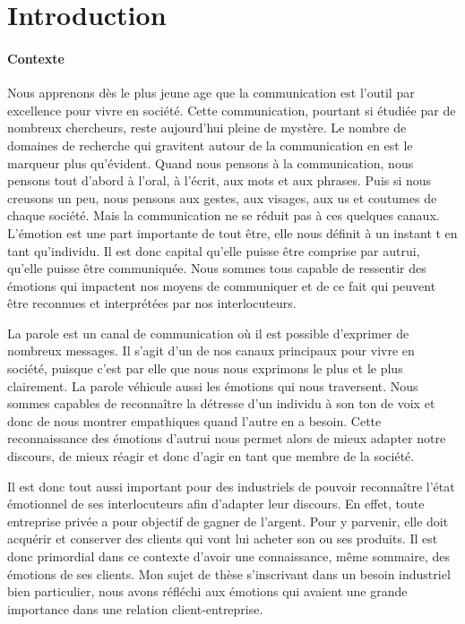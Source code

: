\chapter*{Introduction}

\subsubsection{Contexte}

Nous apprenons dès le plus jeune age que la communication est l'outil par excellence pour vivre en société. Cette communication, pourtant si étudiée par de nombreux chercheurs, reste aujourd'hui pleine de mystère. Le nombre de domaines de recherche qui gravitent autour de la communication en est le marqueur plus qu'évident. Quand nous pensons à la communication, nous pensons tout d'abord à l'oral, à l'écrit, aux mots et aux phrases. Puis si nous creusons un peu, nous pensons aux gestes, aux visages, aux us et coutumes de chaque société. Mais la communication ne se réduit pas à ces quelques canaux. L'émotion est une part importante de tout être, elle nous définit à un instant t en tant qu'individu. Il est donc capital qu'elle puisse être comprise par autrui, qu'elle puisse être communiquée. Nous sommes tous capable de ressentir des émotions qui impactent nos moyens de communiquer et de ce fait qui peuvent être reconnues et interprétées par nos interlocuteurs.

La parole est un canal de communication où il est possible d'exprimer de nombreux messages. Il s'agit d'un de nos canaux principaux pour vivre en société, puisque c'est par elle que nous nous exprimons le plus et le plus clairement. La parole véhicule aussi les émotions qui nous traversent. Nous sommes capables de reconnaître la détresse d'un individu à son ton de voix et donc de nous montrer empathiques quand l'autre en a besoin. Cette reconnaissance des émotions d'autrui nous permet alors de mieux adapter notre discours, de mieux réagir et donc d'agir en tant que membre de la société.

Il est donc tout aussi important pour des industriels de pouvoir reconnaître l'état émotionnel de ses interlocuteurs afin d'adapter leur discours. En effet, toute entreprise privée a pour objectif de gagner de l'argent. Pour y parvenir, elle doit acquérir et conserver des clients qui vont lui acheter son ou ses produits. Il est donc primordial dans ce contexte d'avoir une connaissance, même sommaire, des émotions de ses clients. Mon sujet de thèse s'inscrivant dans un besoin industriel bien particulier, nous avons réfléchi aux émotions qui avaient une grande importance dans une relation client-entreprise.

